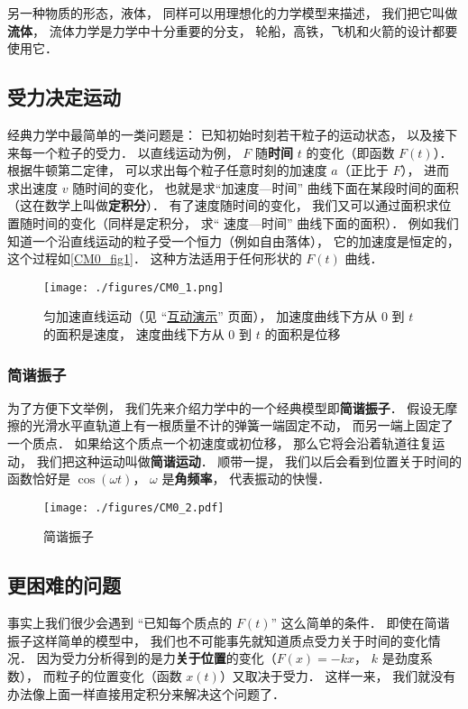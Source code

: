 另一种物质的形态，液体， 同样可以用理想化的力学模型来描述， 我们把它叫做\textbf{流体}， 流体力学是力学中十分重要的分支， 轮船，高铁，飞机和火箭的设计都要使用它．

\subsection{受力决定运动}
经典力学中最简单的一类问题是： 已知初始时刻若干粒子的运动状态， 以及接下来每一个粒子的受力． 以直线运动为例， $F$ 随\textbf{时间} $t$ 的变化（即函数 $F(t)$）． 根据牛顿第二定律， 可以求出每个粒子任意时刻的加速度 $a$（正比于 $F$）， 进而求出速度 $v$ 随时间的变化， 也就是求“加速度—时间” 曲线下面在某段时间的面积（这在数学上叫做\textbf{定积分}）． 有了速度随时间的变化， 我们又可以通过面积求位置随时间的变化（同样是定积分， 求“ 速度—时间” 曲线下面的面积）． 例如我们知道一个沿直线运动的粒子受一个恒力（例如自由落体）， 它的加速度是恒定的， 这个过程如\autoref{CM0_fig1}． 这种方法适用于任何形状的 $F(t)$ 曲线．

\begin{figure}[ht]
\centering
\texttt{[image: ./figures/CM0\_1.png]}
\caption{匀加速直线运动（见 “\href{http://wuli.wiki/apps/consta.html}{互动演示}” 页面）， 加速度曲线下方从 $0$ 到 $t$ 的面积是速度， 速度曲线下方从 $0$ 到 $t$ 的面积是位移} \label{CM0_fig1}
\end{figure}

\subsubsection{简谐振子}
为了方便下文举例， 我们先来介绍力学中的一个经典模型即\textbf{简谐振子}． 假设无摩擦的光滑水平直轨道上有一根质量不计的弹簧一端固定不动， 而另一端上固定了一个质点． 如果给这个质点一个初速度或初位移， 那么它将会沿着轨道往复运动， 我们把这种运动叫做\textbf{简谐运动}． 顺带一提， 我们以后会看到位置关于时间的函数恰好是 $\cos(\omega t)$， $\omega$ 是\textbf{角频率}， 代表振动的快慢．

\begin{figure}[ht]
\centering
\texttt{[image: ./figures/CM0\_2.pdf]}
\caption{简谐振子} \label{CM0_fig2}
\end{figure}

\subsection{更困难的问题}
事实上我们很少会遇到 “已知每个质点的 $F(t)$” 这么简单的条件． 即使在简谐振子这样简单的模型中， 我们也不可能事先就知道质点受力关于时间的变化情况． 因为受力分析得到的是力\textbf{关于位置}的变化（$F(x) = -k x$， $k$ 是劲度系数）， 而粒子的位置变化（函数 $x(t)$）又取决于受力． 这样一来， 我们就没有办法像上面一样直接用定积分来解决这个问题了．

